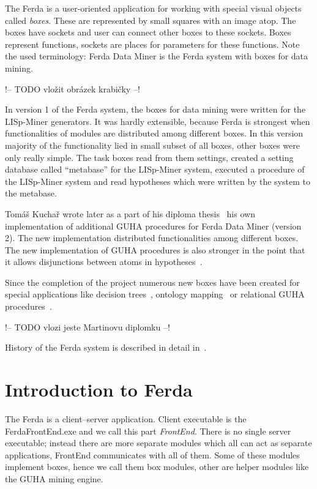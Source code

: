 \documentclass[a4paper,12pt]{book}
\begin{document}
The Ferda is a user-oriented application for working with special visual objects called \emph{boxes}. These are represented by small squares with an image atop. The boxes have sockets and user can connect other boxes to these sockets. Boxes represent functions, sockets are places for parameters for these functions. Note the used terminology: Ferda Data Miner is the Ferda system with boxes for data mining.

!-- TODO vložit obrázek krabičky --!

In version 1 of the Ferda system, the boxes for data mining were written for the LISp-Miner generators. It was hardly extensible, because Ferda is strongest when functionalities of modules are distributed among different boxes. In this version majority of the functionality lied in small subset of all boxes, other boxes were only really simple. The task boxes read from them settings, created a setting database called ``metabase'' for the LISp-Miner system, executed a procedure of the LISp-Miner system and read hypotheses which were written by the system to the metabase.

Tomáš Kuchař wrote later as a part of his diploma thesis~\cite{thesisKuchar} his own implementation of additional GUHA procedures for Ferda Data Miner (version 2). The new implementation distributed functionalities among different boxes. The new implementation of GUHA procedures is also stronger in the point that it allows disjunctions between atoms in hypotheses~\cite{RalbovskyDisjunction}.

Since the completion of the project numerous new boxes have been created for special applications like decision trees~\cite{GUHAtrees}, ontology mapping~\cite{thesisZeman} or relational GUHA procedures~\cite{thesisKuzmin}. 

!-- TODO vlozi jeste Martinovu diplomku --!

History of the Ferda system is described in detail in~\cite{RalbovskyHistory}.

\section{Introduction to Ferda}
The Ferda is a client--server application. Client executable is the FerdaFrontEnd.exe and we call this part \emph{FrontEnd}. There is no single server executable; instead there are more separate modules which all can act as separate applications, FrontEnd communicates with all of them. Some of these modules implement boxes, hence we call them box modules, other are helper modules like the GUHA mining engine.
\end{document}
